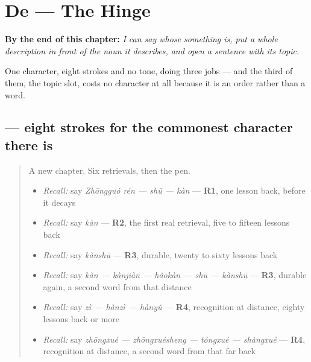 
\chapter{De — The Hinge}
\label{ch:zh-de}

\begin{chapteropening}
\textbf{By the end of this chapter:} \emph{I can say whose something is, put a whole description in front of the noun it describes, and open a sentence with its topic.}

One character, eight strokes and no tone, doing three jobs — and the third of them, the topic slot, costs no character at all because it is an order rather than a word.
\end{chapteropening}

\section[\texorpdfstring{\zh{的} (de)}{的 (de)}]{ — eight strokes for the commonest character there is}

\label{lesson:ZH-W23-de}



\begin{quote}
A new chapter. Six retrievals, then the pen.

\begin{itemize}
\raggedright
  \item \emph{Recall:} say \emph{Zhōngguó rén — shū — kàn} — \textbf{R1}, one lesson back, before it decays
  \item \emph{Recall:} say \emph{kàn} — \textbf{R2}, the first real retrieval, five to fifteen lessons back
  \item \emph{Recall:} say \emph{kànshū} — \textbf{R3}, durable, twenty to sixty lessons back
  \item \emph{Recall:} say \emph{kàn — kànjiàn — hǎokàn — shū — kànshū} — \textbf{R3}, durable again, a second word from that distance
  \item \emph{Recall:} say \emph{zì — hànzì — hànyǔ} — \textbf{R4}, recognition at distance, eighty lessons back or more
  \item \emph{Recall:} say \emph{zhōngxué — zhōngxuésheng — tóngxué — shàngxué} — \textbf{R4}, recognition at distance, a second word from that far back
\end{itemize}
\end{quote}

